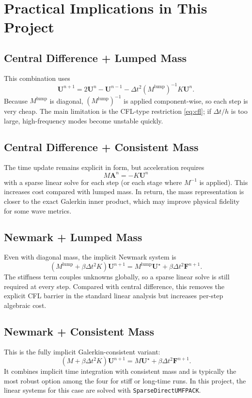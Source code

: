 \documentclass[11pt,a4paper]{report}
\begin{document}
\section{Practical Implications in This Project}
\subsection{Central Difference + Lumped Mass}
This combination uses
\[
\bm U^{n+1}=2\bm U^n-\bm U^{n-1}-\Delta t^2(M^{\mathrm{lump}})^{-1}K\bm U^n.
\]
Because $M^{\mathrm{lump}}$ is diagonal, $(M^{\mathrm{lump}})^{-1}$ is applied
component-wise, so each step is very cheap. The main limitation is the CFL-type
restriction \eqref{eq:cfl}; if $\Delta t/h$ is too large, high-frequency modes
become unstable quickly.

\subsection{Central Difference + Consistent Mass}
The time update remains explicit in form, but acceleration requires
\[
M\bm A^n=-K\bm U^n
\]
with a sparse linear solve for each step (or each stage where $M^{-1}$ is
applied). This increases cost compared with lumped mass. In return, the mass
representation is closer to the exact Galerkin inner product, which may improve
physical fidelity for some wave metrics.

\subsection{Newmark + Lumped Mass}
Even with diagonal mass, the implicit Newmark system is
\[
\left(M^{\mathrm{lump}}+\beta\Delta t^2K\right)\bm U^{n+1}
=M^{\mathrm{lump}}\bm U^\star+\beta\Delta t^2\bm F^{n+1}.
\]
The stiffness term couples unknowns globally, so a sparse linear solve is still
required at every step. Compared with central difference, this removes the
explicit CFL barrier in the standard linear analysis but increases per-step
algebraic cost.

\subsection{Newmark + Consistent Mass}
This is the fully implicit Galerkin-consistent variant:
\[
\left(M+\beta\Delta t^2K\right)\bm U^{n+1}
=M\bm U^\star+\beta\Delta t^2\bm F^{n+1}.
\]
It combines implicit time integration with consistent mass and is typically the
most robust option among the four for stiff or long-time runs. In this project,
the linear systems for this case are solved with \texttt{SparseDirectUMFPACK}.
\end{document}
